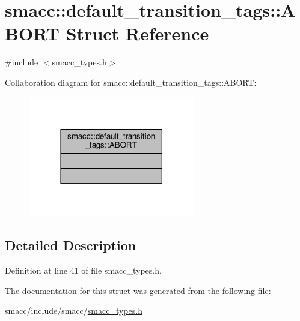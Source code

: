 \hypertarget{structsmacc_1_1default__transition__tags_1_1ABORT}{}\section{smacc\+:\+:default\+\_\+transition\+\_\+tags\+:\+:A\+B\+O\+RT Struct Reference}
\label{structsmacc_1_1default__transition__tags_1_1ABORT}


{\ttfamily \#include $<$smacc\+\_\+types.\+h$>$}



Collaboration diagram for smacc\+:\+:default\+\_\+transition\+\_\+tags\+:\+:A\+B\+O\+RT\+:\nopagebreak
\begin{figure}[H]
\begin{center}
\leavevmode
\includegraphics[width=206pt]{structsmacc_1_1default__transition__tags_1_1ABORT__coll__graph}
\end{center}
\end{figure}


\subsection{Detailed Description}


Definition at line 41 of file smacc\+\_\+types.\+h.



The documentation for this struct was generated from the following file\+:\begin{DoxyCompactItemize}
\item 
smacc/include/smacc/\hyperlink{smacc__types_8h}{smacc\+\_\+types.\+h}\end{DoxyCompactItemize}
